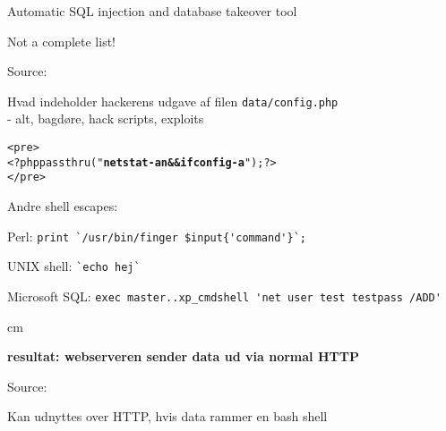 \documentclass[Screen16to9,17pt]{foils}
\begin{document}
\begin{list1}
\item Automatic SQL injection and database takeover tool
\end{list1}




Not a complete list!

Source: 


\begin{list1}
\item Hvad indeholder hackerens udgave af filen \verb+data/config.php+ \\
- alt, bagdøre, hack scripts, exploits
\end{list1}
\begin{alltt}
<pre>
<?php passthru("{\bfseries netstat -an && ifconfig -a}"); ?>
</pre>
\end{alltt}
\begin{list1}
\item Andre shell escapes:
\begin{list2}
\item Perl: \verb+print `/usr/bin/finger $input{'command'}`;+
\item UNIX shell: \verb+`echo hej`+
\item Microsoft SQL: \verb+exec master..xp_cmdshell 'net user test testpass /ADD'+
\end{list2}
\end{list1}

 cm

\centerline{\bfseries resultat: webserveren sender data ud via normal HTTP}




Source:

\centerline{Kan udnyttes over HTTP, hvis data rammer en bash shell}



\end{document}
